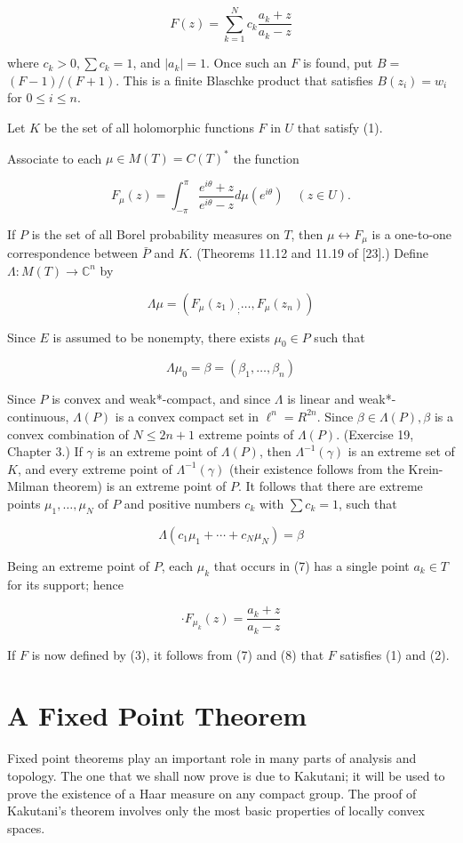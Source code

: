 \documentclass[10pt]{article}
\begin{document}
$$
F(z)=\sum_{k=1}^{N} c_{k} \frac{a_{k}+z}{a_{k}-z}
$$

where $c_{k}>0, \sum c_{k}=1$, and $\left|a_{k}\right|=1$. Once such an $F$ is found, put $B=$ $(F-1) /(F+1)$. This is a finite Blaschke product that satisfies $B\left(z_{i}\right)=w_{i}$ for $0 \leq i \leq n$.

Let $K$ be the set of all holomorphic functions $F$ in $U$ that satisfy (1).

Associate to each $\mu \in M(T)=C(T)^{*}$ the function

$$
F_{\mu}(z)=\int_{-\pi}^{\pi} \frac{e^{i \theta}+z}{e^{i \theta}-z} d \mu\left(e^{i \theta}\right) \quad(z \in U) .
$$

If $P$ is the set of all Borel probability measures on $T$, then $\mu \leftrightarrow F_{\mu}$ is a one-to-one correspondence between $\bar{P}$ and $K$. (Theorems 11.12 and 11.19 of [23].) Define $\Lambda: M(T) \rightarrow \mathbb{C}^{n}$ by

$$
\Lambda \mu=\left(F_{\mu}\left(z_{1}\right)_{;} \ldots, F_{\mu}\left(z_{n}\right)\right)
$$

Since $E$ is assumed to be nonempty, there exists $\mu_{0} \in P$ such that

$$
\Lambda \mu_{0}=\beta=\left(\beta_{1}, \ldots, \beta_{n}\right)
$$

Since $P$ is convex and weak*-compact, and since $\Lambda$ is linear and weak*-continuous, $\Lambda(P)$ is a convex compact set in $\ell^{n}=R^{2 n}$. Since $\beta \in \Lambda(P), \beta$ is a convex combination of $N \leq 2 n+1$ extreme points of $\Lambda(P)$. (Exercise 19, Chapter 3.) If $\gamma$ is an extreme point of $\Lambda(P)$, then $\Lambda^{-1}(\gamma)$ is an extreme set of $K$, and every extreme point of $\Lambda^{-1}(\gamma)$ (their existence follows from the Krein-Milman theorem) is an extreme point of $P$. It follows that there are extreme points $\mu_{1}, \ldots, \mu_{N}$ of $P$ and positive numbers $c_{k}$ with $\sum c_{k}=1$, such that

$$
\Lambda\left(c_{1} \mu_{1}+\cdots+c_{N} \mu_{N}\right)=\beta
$$

Being an extreme point of $P$, each $\mu_{k}$ that occurs in (7) has a single point $a_{k} \in T$ for its support; hence

$$
\cdot F_{\mu_{k}}(z)=\frac{a_{k}+z}{a_{k}-z}
$$

If $F$ is now defined by (3), it follows from (7) and (8) that $F$ satisfies (1) and (2).

\section{A Fixed Point Theorem}
Fixed point theorems play an important role in many parts of analysis and topology. The one that we shall now prove is due to Kakutani; it will be used to prove the existence of a Haar measure on any compact group. The proof of Kakutani's theorem involves only the most basic properties of locally convex spaces.
\end{document}
